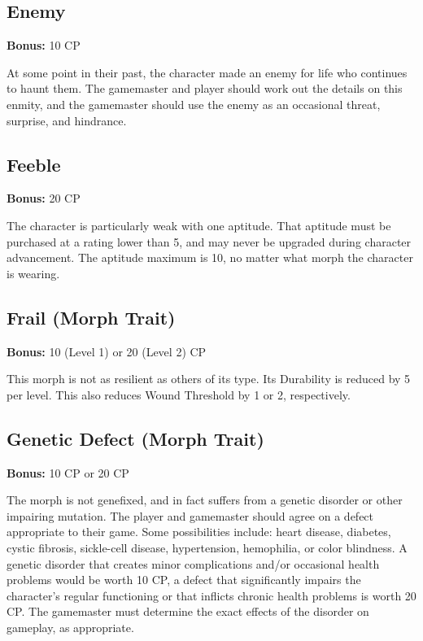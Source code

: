\subsection{Enemy} \label{sec:traits-enemy} 

\textbf{Bonus:} 10 CP 

At some point in their past, the character made an enemy for life who continues to haunt them. The gamemaster and player should work out the details on this enmity, and the gamemaster should use the enemy as an occasional threat, surprise, and hindrance. 

\subsection{Feeble} \label{sec:traits-feeble} 

\textbf{Bonus:} 20 CP 

The character is particularly weak with one aptitude. That aptitude must be purchased at a rating lower than 5, and may never be upgraded during character advancement. The aptitude maximum is 10, no matter what morph the character is wearing. 

\subsection{Frail (Morph Trait)} \label{sec:traits-frail} 

\textbf{Bonus:} 10 (Level 1) or 20 (Level 2) CP 

This morph is not as resilient as others of its type. Its Durability is reduced by 5 per level. This also reduces Wound Threshold by 1 or 2, respectively. 

\subsection{Genetic Defect (Morph Trait)} \label{sec:traits-genetic-defect} 

\textbf{Bonus:} 10 CP or 20 CP 

The morph is not genefixed, and in fact suffers from a genetic disorder or other impairing mutation. The player and gamemaster should agree on a defect appropriate to their game. Some possibilities include: heart disease, diabetes, cystic fibrosis, sickle-cell disease, hypertension, hemophilia, or color blindness. A genetic disorder that creates minor complications and/or occasional health problems would be worth 10 CP, a defect that significantly impairs the character’s regular functioning or that inflicts chronic health problems is worth 20 CP. The gamemaster must determine the exact effects of the disorder on gameplay, as appropriate. 

